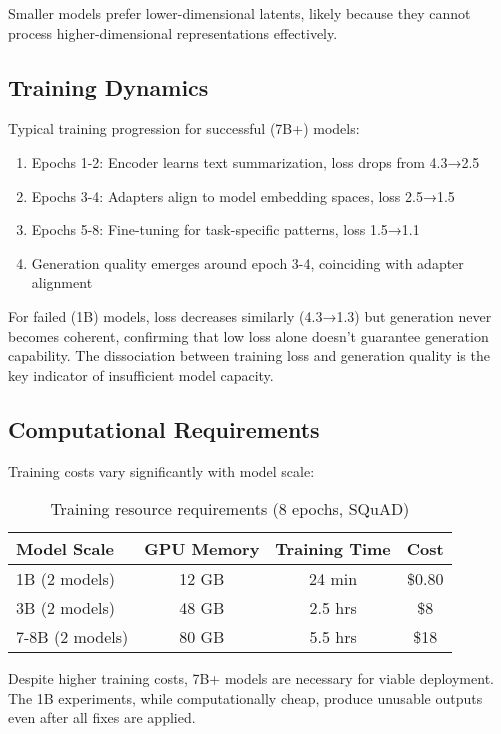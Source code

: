 \documentclass{article}
\begin{document}
Smaller models prefer lower-dimensional latents, likely because they cannot process higher-dimensional representations effectively.

\subsection{Training Dynamics}

Typical training progression for successful (7B+) models:
\begin{enumerate}
\item Epochs 1-2: Encoder learns text summarization, loss drops from 4.3→2.5
\item Epochs 3-4: Adapters align to model embedding spaces, loss 2.5→1.5
\item Epochs 5-8: Fine-tuning for task-specific patterns, loss 1.5→1.1
\item Generation quality emerges around epoch 3-4, coinciding with adapter alignment
\end{enumerate}

For failed (1B) models, loss decreases similarly (4.3→1.3) but generation never becomes coherent, confirming that low loss alone doesn't guarantee generation capability. The dissociation between training loss and generation quality is the key indicator of insufficient model capacity.

\subsection{Computational Requirements}

Training costs vary significantly with model scale:

\begin{table}[h]
\caption{Training resource requirements (8 epochs, SQuAD)}
\vskip 0.15in
\begin{center}
\begin{small}
\begin{tabular}{lccc}
\toprule
Model Scale & GPU Memory & Training Time & Cost \\
\midrule
1B (2 models) & 12 GB & 24 min & \$0.80 \\
3B (2 models) & 48 GB & 2.5 hrs & \$8 \\
7-8B (2 models) & 80 GB & 5.5 hrs & \$18 \\
\bottomrule
\end{tabular}
\end{small}
\end{center}
\end{table}

Despite higher training costs, 7B+ models are necessary for viable deployment. The 1B experiments, while computationally cheap, produce unusable outputs even after all fixes are applied.
\end{document}
